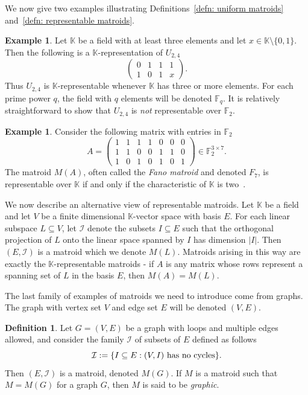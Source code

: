 \documentclass[12pt]{article}
\theoremstyle{definition}
\newtheorem{defn}[thm]{Definition}
\newtheorem{ex}[thm]{Example}
\begin{document}
We now give two examples illustrating Definitions~\ref{defn: uniform matroids} and~\ref{defn: representable matroids}.

\begin{ex}\label{ex: representability of U24} 
Let $\mathbb{K}$ be a field with at least three elements and let $x \in \mathbb{K}\setminus\{0,1\}$.
Then the following is a $\mathbb{K}$-representation of $U_{2,4}$
\[
    \begin{pmatrix}
        0 & 1 & 1 & 1 \\
        1 & 0 & 1 & x
    \end{pmatrix}.
\]
Thus $U_{2,4}$ is $\mathbb{K}$-representable whenever $\mathbb{K}$ has three or more elements.
For each prime power $q$, the field with $q$ elements will be denoted $\mathbb{F}_q$.
It is relatively straightforward to show that $U_{2,4}$ is \emph{not} representable over $\mathbb{F}_2$.
\end{ex}


\begin{ex}\label{ex: fano plane}
    Consider the following matrix with entries in $\mathbb{F}_2$
    \[
        A =     
        \begin{pmatrix}
            1 & 1 & 1 & 1 & 0 & 0 & 0 \\
            1 & 1 & 0 & 0 & 1 & 1 & 0 \\
            1 & 0 & 1 & 0 & 1 & 0 & 1
        \end{pmatrix} \in \mathbb{F}_2^{3\times 7}.
    \]
    The matroid $M(A)$, often called the \emph{Fano matroid} and denoted $F_7$,
    is representable over $\mathbb{K}$ if and only if the characteristic of $\mathbb{K}$ is two~\cite[Proposition 6.4.8]{oxley}.
\end{ex}

    We now describe an alternative view of representable matroids.
    Let $\mathbb{K}$ be a field and let $V$ be a finite dimensional $\mathbb{K}$-vector space with basis $E$.
    For each linear subspace $L \subseteq V$, let $\mathcal{I}$ denote the subsets $I \subseteq E$
    such that the orthogonal projection of $L$ onto the linear space spanned by $I$ has dimension $|I|$.
    Then $(E,\mathcal{I})$ is a matroid which we denote $M(L)$.
    Matroids arising in this way are exactly the $\mathbb{K}$-representable matroids -
    if $A$ is any matrix whose rows represent a spanning set of $L$ in the basis $E$,
    then $M(A) = M(L)$.

The last family of examples of matroids we need to introduce come from graphs.
The graph with vertex set $V$ and edge set $E$ will be denoted $(V,E)$.
\begin{defn}\label{defn: graphic matroid}
    Let $G = (V,E)$ be a graph with loops and multiple edges allowed, and consider the family $\mathcal{I}$ of subsets of $E$ defined as follows
    \[
        \mathcal{I} := \{I \subseteq E : (V,I) {\rm \ has \ no \ cycles} \}.
    \]
    Then $(E,\mathcal{I})$ is a matroid, denoted $M(G)$.
    If $M$ is a matroid such that $M = M(G)$ for a graph $G$,
    then $M$ is said to be \emph{graphic}.
\end{defn}
\end{document}
